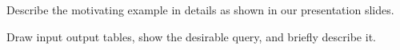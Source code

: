 
Describe the motivating example in details as shown in our presentation slides.

Draw input output tables, show the desirable query, and briefly describe it.
